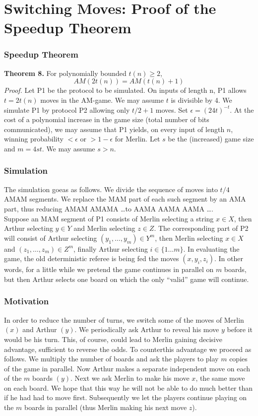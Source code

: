 \documentclass{beamer}
\begin{document}
\section{Switching Moves: Proof of the Speedup Theorem}

\begin{frame}
\frametitle{Speedup Theorem}
\textbf{Theorem 8.} For polynomially bounded $t(n) \geq 2$, $$AM(2t(n)) = AM(t(n) + 1)$$
\textit{Proof.} Let P1 be the protocol to be simulated. On inputs of length n, P1 allows $t=2t(n)$ moves in the AM-game. We may assume $t$ is divisible by 4. We simulate P1 by protocol P2 allowing only $t/2 + 1$ moves. Set $\epsilon = (24t)^{-t}$. At the cost of a polynomial increase in the game size (total number of bits communicated), we may assume that P1 yields, on every input of length $n$, winning probability $< \epsilon$ or $> 1 - \epsilon$ for Merlin. Let $s$ be the (increased) game size and $m = 4st$. We may assume $s > n$.
\end{frame}

\begin{frame}
\frametitle{Simulation}
The simulation goeas as follows. We divide the sequence of moves into $t/4$ AMAM segments. We replace the MAM part of each such segment by an AMA part, thus reducing AMAM AMAMA \dots to AAMA AAMA AAMA \dots.\\
Suppose an MAM segment of P1 consists of Merlin selecting a string $x \in X$, then Arthur selecting $y \in Y$ and Merlin selecting $z \in Z$. The corresponding part of P2 will consist of Arthur selecting $(y_1,\dots,y_m)\in Y^m$, then Merlin selecting $x\in X$ and $(z_1,\dots,z_m)\in Z^m$, finally Arthur selecting $i \in \{1\ldots m\}$. In evaluating the game, the old deterministic referee is being fed the moves $(x, y_i, z_i)$. In other words, for a little while we pretend the game continues in parallel on $m$ boards, but then Arthur selects one board on which the only ``valid'' game will continue.
\end{frame}

\begin{frame}
\frametitle{Motivation}
In order to reduce the number of turns, we switch some of the moves of Merlin $(x)$ and Arthur $(y)$. We periodically ask Arthur to reveal his move $y$ before it would be his turn. This, of course, could lead to Merlin gaining decisive advantage, sufficient to reverse the odds. To counterthis advantage we proceed as follows. We multiply the number of boards and ask the players to play $m$ copies of the game in parallel. Now Arthur makes a separate independent move on each of the $m$ boards $(y)$. Next we ask Merlin to make his move $x$, the same move on each board. We hope that this way he will not be able to do much better than if he had had to move first. Subsequently we let the players continue playing on the $m$ boards in parallel (thus Merlin making his next move $z$).
\end{frame}
\end{document}
